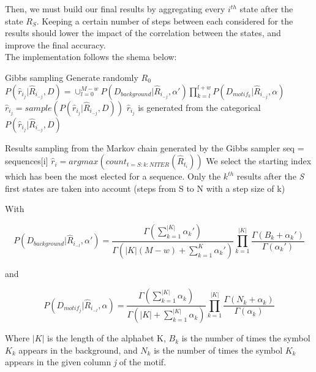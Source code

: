 Then, we must build our final results by aggregating every $i^{th}$ state after the state $R_S$. Keeping a certain number of steps between each considered for the results should lower the impact of the correlation between the states, and improve the final accuracy.
\\

The implementation follows the shema below:

\begin{algorithmic}[1]
\State \Comment Gibbs sampling
\State Generate randomly $R_0$
            \State $P(\widehat{r}_{i_j}|\widehat{R}_{i_{-j}}, D) = \cup_{l = 0}^{M-w} P(D_{background}|\widehat{R}_{i_{-j}},\alpha') \prod\limits_{k = l}^{l + w} P(D_{motif_k}|\widehat{R}_{i_{-j}},\alpha)$
        \State $\widehat{r}_{i_j} = sample(P(\widehat{r}_{i_j}|\widehat{R}_{i_{-j}},D))$ \Comment $\widehat{r}_{i_j}$ is generated from the categorical $P(\widehat{r}_{i_j}|\widehat{R}_{i_{-j}},D)$
    \EndFor
\EndFor

\State \Comment Results sampling from the Markov chain generated by the Gibbs sampler
    \State seq = sequences[i]
    \State $\widehat{r}_i = argmax(count_{t = S:k:NITER}(\widehat{R}_{t_i}))$ \Comment We select the starting index which has been the most elected for a sequence. Only the $k^{th}$ results after the \textit{S} first states are taken into account (steps from S to N with a step size of k)
\EndFor
\end{algorithmic}

With

\begin{equation}
P(D_{background}|\widehat{R}_{i_{-l}},\alpha') = \frac{\Gamma (\sum\limits_{k = 1}^{|K|} \alpha_k')}{\Gamma (|K|(M-w) + \sum\limits_{k = 1}^{K} \alpha_k')} \prod\limits_{k = 1}^{|K|} \frac{\Gamma(B_k + \alpha_k')}{\Gamma(\alpha_k')}
\end{equation}

and

\begin{equation}
P(D_{motif_j}|\widehat{R}_{i_{-l}},\alpha) = \frac{\Gamma (\sum\limits_{k = 1}^{|K|} \alpha_k)}{\Gamma (|K| + \sum\limits_{k = 1}^{|K|} \alpha_k)} \prod\limits_{k = 1}^{|K|} \frac{\Gamma(N_k + \alpha_k)}{\Gamma(\alpha_k)}
\end{equation}

Where $|K|$ is the length of the alphabet K, $B_k$ is the number of times the symbol $K_k$ appears in the background, and $N_k$ is the number of times the symbol $K_k$ appears in the given column \textit{j} of the motif.

